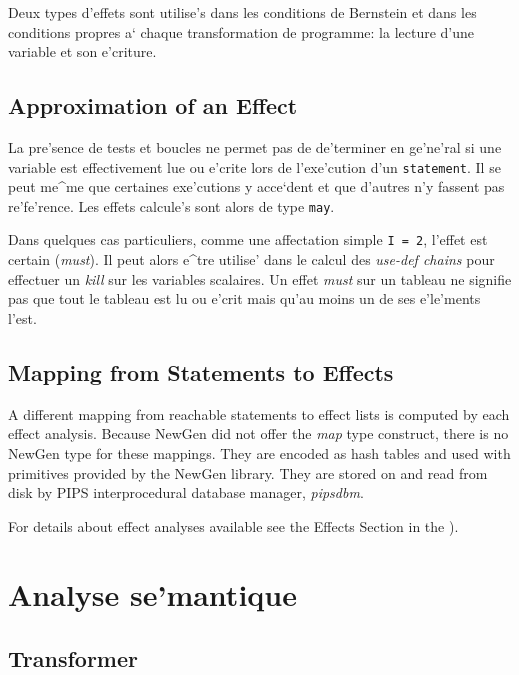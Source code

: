 {}

Deux types d'effets sont utilise's dans les conditions de Bernstein
et dans les conditions propres a` chaque transformation de programme:
la lecture d'une variable et son e'criture.

\subsection{Approximation of an Effect}
\label{subsection-approximation}

{}

La pre'sence de tests et boucles ne permet pas de de'terminer en ge'ne'ral
si une variable est effectivement lue ou e'crite lors de l'exe'cution
d'un {\tt statement}. Il se peut me^me que certaines exe'cutions
y acce`dent et que d'autres n'y fassent pas re'fe'rence. Les effets
calcule's sont alors de type {\tt may}.

Dans quelques cas particuliers, comme une affectation simple {\tt I = 2},
l'effet est certain ({\em must}). Il peut alors e^tre utilise' dans
le calcul des {\em use-def chains} pour effectuer un {\em kill} sur les
variables scalaires. Un effet {\em must} sur un tableau ne signifie pas
que tout le tableau est lu ou e'crit mais qu'au moins un de ses
e'le'ments l'est.

\subsection{Mapping from Statements to Effects}

A different mapping from reachable statements to effect lists is
computed by each effect analysis. Because NewGen did not offer the {\em
map} type construct, there is no NewGen type for these mappings. They
are encoded as hash tables and used with primitives provided by the
NewGen library. They are stored on and read from disk by PIPS
interprocedural database manager, {\em pipsdbm}.

For details about effect analyses available see the Effects Section in the
).

\section{Analyse se'mantique}
\label{semantics}

\subsection{Transformer}
\label{subsection-transformer}

